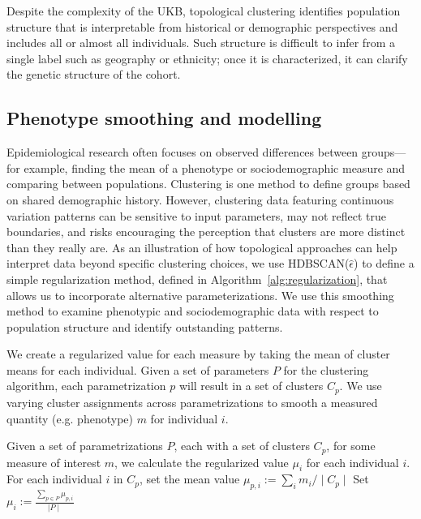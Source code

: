 Despite the complexity of the UKB, topological clustering identifies population structure that is interpretable from historical or demographic perspectives and includes all or almost all individuals. Such structure is difficult to infer from a single label such as geography or ethnicity; once it is characterized, it can clarify the genetic structure of the cohort. 

\subsection{Phenotype smoothing and modelling}

Epidemiological research often focuses on observed differences between groups---for example, finding the mean of a phenotype or sociodemographic measure and comparing between populations. Clustering is one method to define groups based on shared demographic history. However, clustering data featuring continuous variation patterns can be sensitive to input parameters, may not reflect true boundaries, and risks encouraging the perception that clusters are more distinct than they really are\citep{lewis_getting_2022}. As an illustration of how topological approaches can help interpret data beyond specific clustering choices, we use HDBSCAN($\hat{\epsilon}$) to define a simple regularization method, defined in Algorithm~\ref{alg:regularization}, that allows us to incorporate alternative parameterizations. We use this smoothing method to examine phenotypic and sociodemographic data with respect to population structure and identify outstanding patterns.

\begin{algorithm}
\caption{We create a regularized value for each measure by taking the mean of cluster means for each individual. Given a set of parameters $P$ for the clustering algorithm, each parametrization $p$ will result in a set of clusters $C_p$. We use varying cluster assignments across parametrizations to smooth a measured quantity (e.g. phenotype) $m$ for individual $i$.}
\label{alg:regularization}
\begin{algorithmic}
\State Given a set of parametrizations $P$, each with a set of clusters $C_p$, for some measure of interest $m$, we calculate the regularized value $\mu_i$ for each individual $i$.
\State For each individual $i$ in $C_p$, set the mean value $\mu_{p,i}:=\sum_{i}m_i/\mid C_p \mid $
\EndFor
\EndFor
\State Set $\mu_{i}:=\frac{\sum_{p \in P}\mu_{p,i}}{\mid P \mid}$
\end{algorithmic}
\end{algorithm}

